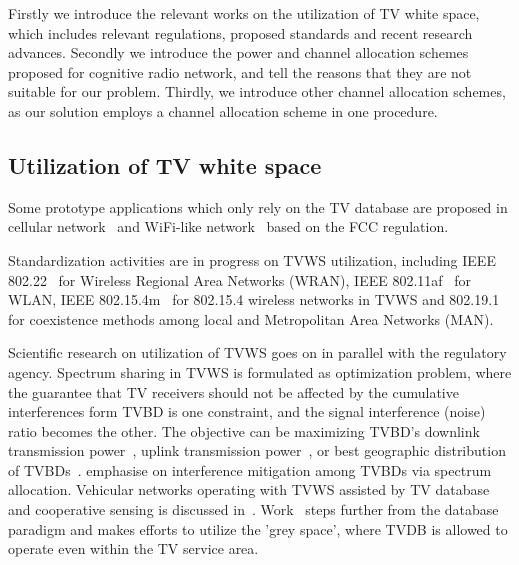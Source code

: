 Firstly we introduce the relevant works on the utilization of TV white space, which includes relevant regulations, proposed standards and recent research advances.
Secondly we introduce the power and channel allocation schemes proposed for cognitive radio network, and tell the reasons that they are not suitable for our problem.
Thirdly, we introduce other channel allocation schemes, as our solution employs a channel allocation scheme in one procedure.

\subsection{Utilization of TV white space}
Some prototype applications which only rely on the TV database are proposed in cellular network~\cite{tvwhite_lte2011, multicell_geo_dyspan11} and WiFi-like network~\cite{whitefi09} based on the FCC regulation.

Standardization activities are in progress on TVWS utilization, including IEEE 802.22~\cite{802.22} for Wireless Regional Area Networks (\gls{WRAN}), IEEE 802.11af~\cite{802.11af} for WLAN, IEEE 802.15.4m~\cite{802.15.4m} for 802.15.4 wireless networks in TVWS and 802.19.1~\cite{802.19} for coexistence methods among local and Metropolitan Area Networks (\gls{MAN}).


Scientific research on utilization of TVWS goes on in parallel with the regulatory agency.
Spectrum sharing in TVWS is formulated as optimization problem, where the guarantee that TV receivers should not be affected by the cumulative interferences form TVBD is one constraint, and the signal interference (noise) ratio becomes the other.
The objective can be maximizing TVBD's downlink transmission power~\cite{multipleIntf_pimrc11}, uplink transmission power~\cite{uplink_power_tvws13}, or best geographic distribution of TVBDs~\cite{withinTVcoverage_PIMRC13}.
\cite{game_CA_association_ICDCS12,SA_CA_TVWS_2012crowncom, 802.22co-existence09, 802.22game_08globecom,self-coexistenceWRAN2010infocom} emphasise on interference mitigation among TVBDs via spectrum allocation.
Vehicular networks operating with TVWS assisted by TV database and cooperative sensing is discussed in~\cite{tvws_vtc13}.
Work~\cite{increaseTVWS12} steps further from the database paradigm and makes efforts to utilize the 'grey space', where TVDB is allowed to operate even within the TV service area.



